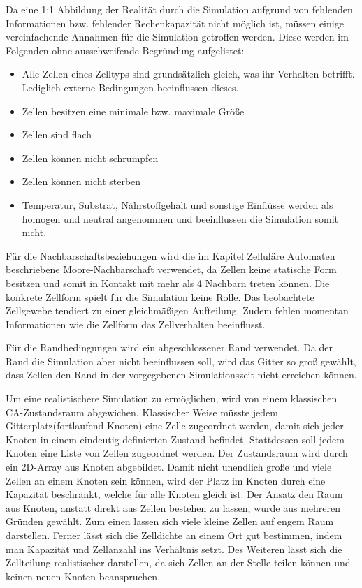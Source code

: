 \documentclass[11pt,a4paper,pointlessnumbers]{scrreprt}  %
\begin{document}
Da eine 1:1 Abbildung der Realität durch die Simulation aufgrund von fehlenden Informationen bzw. fehlender Rechenkapazität nicht möglich ist, müssen einige vereinfachende Annahmen für die Simulation getroffen werden. Diese werden im Folgenden ohne ausschweifende Begründung aufgelistet:

\begin{itemize}
	\item Alle Zellen eines Zelltyps sind grundsätzlich gleich, was ihr Verhalten betrifft. Lediglich externe Bedingungen beeinflussen dieses.
	\item Zellen besitzen eine minimale bzw. maximale Größe
	\item Zellen sind flach
	\item Zellen können nicht schrumpfen
	\item Zellen können nicht sterben
	\item Temperatur, Substrat, Nährstoffgehalt und sonstige Einflüsse werden als homogen und neutral angenommen und beeinflussen die Simulation somit nicht.
\end{itemize}

Für die Nachbarschaftsbeziehungen wird die im Kapitel Zelluläre Automaten beschriebene Moore-Nachbarschaft verwendet, da Zellen keine statische Form besitzen und somit in Kontakt mit mehr als 4 Nachbarn treten können. Die konkrete Zellform spielt für die Simulation keine Rolle. Das beobachtete Zellgewebe tendiert zu einer gleichmäßigen Aufteilung. Zudem fehlen momentan Informationen wie die Zellform das Zellverhalten beeinflusst.\par 

Für die Randbedingungen wird ein abgeschlossener Rand verwendet. Da der Rand die Simulation aber nicht beeinflussen soll, wird das Gitter so groß gewählt, dass Zellen den Rand in der vorgegebenen Simulationszeit nicht erreichen können. \par 

Um eine realistischere Simulation zu ermöglichen, wird von einem klassischen CA-Zustandsraum abgewichen. Klassischer Weise müsste jedem Gitterplatz(fortlaufend Knoten) eine Zelle zugeordnet werden, damit sich jeder Knoten in einem eindeutig definierten Zustand befindet. Stattdessen soll jedem Knoten eine Liste von Zellen zugeordnet werden. Der Zustandsraum wird durch ein 2D-Array aus Knoten abgebildet. Damit nicht unendlich große und viele Zellen an einem Knoten sein können, wird der Platz im Knoten durch eine Kapazität beschränkt, welche für alle Knoten gleich ist. Der Ansatz den Raum aus Knoten, anstatt direkt aus Zellen bestehen zu lassen, wurde aus mehreren Gründen gewählt. Zum einen lassen sich viele kleine Zellen auf engem Raum darstellen. Ferner lässt sich die Zelldichte an einem Ort gut bestimmen, indem man Kapazität und Zellanzahl ins Verhältnis setzt. Des Weiteren lässt sich die Zellteilung realistischer darstellen, da sich Zellen an der Stelle teilen können und keinen neuen Knoten beanspruchen. \par
\end{document}
